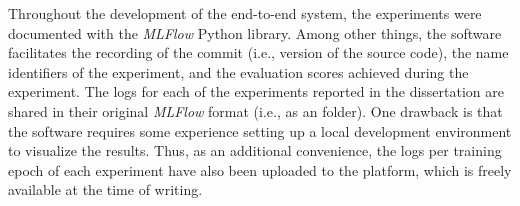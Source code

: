 
Throughout the development of the end-to-end system, the
experiments were documented with the \emph{MLFlow}
\textcite{zaharia2018accelerating} Python library. Among
other things, the software facilitates the recording of the
 commit (i.e., version of the source code), the
name identifiers of the experiment, and the evaluation
scores achieved during the experiment. The logs for each of
the experiments reported in the dissertation are shared in
their original \emph{MLFlow} format (i.e., as an
 folder). One drawback is that the software
requires some experience setting up a local development
environment to visualize the results. Thus, as an additional
convenience, the logs per training epoch of each experiment
have also been uploaded to the
platform, which is
freely available at the time of writing.

